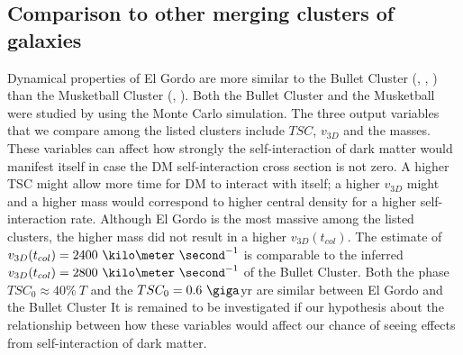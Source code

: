 \subsection{Comparison to other merging clusters of galaxies}
%
Dynamical properties of El Gordo are more similar to the Bullet Cluster
(\citealt{Bradac2006b}, \citealt{Springel2007}, \citealt{Mastropietro2008a})
than the Musketball Cluster (\citealt{Dawson12}, ). Both the Bullet Cluster and the Musketball
were studied by  using the Monte Carlo simulation.
The three output variables that we compare among the listed clusters include $TSC$,
$v_{3D}$ and the masses. These variables can affect
how strongly the self-interaction of dark matter would manifest itself in
case the DM self-interaction cross section is not zero. A higher TSC might
allow more time for DM to interact with itself; a higher $v_{3D}$ might
 and a higher mass would correspond to
higher central density for a higher self-interaction rate. Although El
Gordo is the most massive among the listed clusters, the higher mass did not result in a higher $v_{3D}(t_{col})$.
The estimate of $v_{3D}(t_{col}) = 2400~\kilo\meter~\second^{-1}$ is
comparable to the inferred $v_{3D}(t_{col}) =
2800~\kilo\meter~\second^{-1}$ of the Bullet Cluster. 
Both the phase $TSC_0  \approx 40\%~T$ and the $TSC_0 = 0.6~\giga$yr are
similar between El Gordo and the Bullet Cluster
It is remained to be investigated if our hypothesis about the relationship
between how these variables would affect our chance of seeing effects from
self-interaction of dark matter. 
%
